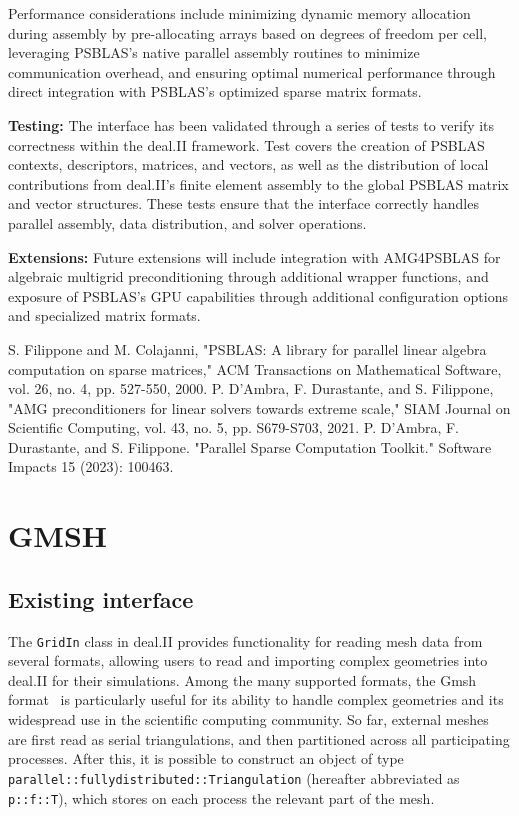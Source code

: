 \documentclass[a4paper,12pt]{article}
\begin{document}
Performance considerations include minimizing dynamic memory allocation
during assembly by pre-allocating arrays based on degrees of freedom per cell,
leveraging PSBLAS's native parallel assembly routines to minimize communication
overhead, and ensuring optimal numerical performance through direct
integration with PSBLAS's optimized sparse matrix formats.

\textbf{Testing:} The interface has been validated through a series of tests
to verify its correctness within the deal.II framework. Test covers the creation of PSBLAS contexts,
descriptors, matrices, and vectors, as well as the distribution of local contributions
from deal.II's finite element assembly to the global PSBLAS matrix and vector structures.
These tests ensure that the interface correctly handles parallel assembly,
data distribution, and solver operations.

\textbf{Extensions:} Future extensions will include integration with AMG4PSBLAS for algebraic multigrid
preconditioning through additional wrapper functions, and exposure of PSBLAS's GPU capabilities through
additional configuration options and specialized matrix formats.


\begin{thebibliography}{10}
     S. Filippone and M. Colajanni, "PSBLAS: A library for parallel linear algebra computation on sparse matrices," ACM Transactions on Mathematical Software, vol. 26, no. 4, pp. 527-550, 2000.
     P. D'Ambra, F. Durastante, and S. Filippone, "AMG preconditioners for linear solvers towards extreme scale," SIAM Journal on Scientific Computing, vol. 43, no. 5, pp. S679-S703, 2021.
     P. D’Ambra, F. Durastante, and S. Filippone. "Parallel Sparse Computation Toolkit." Software Impacts 15 (2023): 100463.
\end{thebibliography}

\newpage


\section{GMSH}
\label{sec:gmsh}

\subsection{Existing interface}
The \texttt{GridIn} class in deal.II provides functionality for reading
mesh data from several formats, allowing users to read and importing
complex geometries into deal.II for their simulations. Among the many supported formats,
the Gmsh format~\cite{gmsh} is particularly useful for its ability to handle complex geometries
and its widespread use in the scientific computing community. So far, external meshes
are first read as serial triangulations, and then partitioned across all
participating processes. After this, it is possible to construct an object of type
\texttt{parallel::fullydistributed::Triangulation} (hereafter abbreviated as \texttt{p::f::T}), which stores on each process
the relevant part of the mesh.
\end{document}
